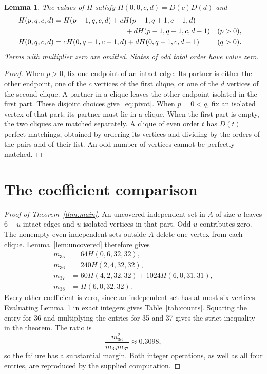 \documentclass[11pt]{article}
\newtheorem{lemma}[theorem]{Lemma}
\begin{document}
\begin{lemma}\label{lem:pivot}
The values of $H$ satisfy $H(0,0,c,d)=D(c)D(d)$ and
\begin{align}
H(p,q,c,d)&=H(p-1,q,c,d)+cH(p-1,q+1,c-1,d)\notag\\
&\hspace{35mm}+dH(p-1,q+1,c,d-1) &&(p>0),\label{eq:pivot}\\
H(0,q,c,d)&=cH(0,q-1,c-1,d)+dH(0,q-1,c,d-1)&&(q>0).
\end{align}
Terms with multiplier zero are omitted. States of odd total order have
value zero.
\end{lemma}
\begin{proof}
When $p>0$, fix one endpoint of an intact edge. Its partner is either
the other endpoint, one of the $c$ vertices of the first clique, or
one of the $d$ vertices of the second clique. A partner in a clique
leaves the other endpoint isolated in the first part. These disjoint
choices give~\eqref{eq:pivot}. When $p=0<q$, fix an isolated vertex
of that part; its partner must lie in a clique. When the first part
is empty, the two cliques are matched separately. A clique of even
order $t$ has $D(t)$ perfect matchings, obtained by ordering its
vertices and dividing by the orders of the pairs and of their list.
An odd number of vertices cannot be perfectly matched.
\end{proof}

\section{The coefficient comparison}
\begin{proof}[Proof of Theorem~\ref{thm:main}]
An uncovered independent set in $A$ of size $u$ leaves $6-u$ intact
edges and $u$ isolated vertices in that part. Odd $u$ contributes zero.
The nonempty even independent sets outside $A$ delete one vertex from
each clique. Lemma~\ref{lem:uncovered} therefore gives
\begin{align*}
m_{35}&=64H(0,6,32,32),\\
m_{36}&=240H(2,4,32,32),\\
m_{37}&=60H(4,2,32,32)+1024H(6,0,31,31),\\
m_{38}&=H(6,0,32,32).
\end{align*}
Every other coefficient is zero, since an independent set has at most
six vertices. Evaluating Lemma~\ref{lem:pivot} in exact integers gives
Table~\ref{tab:counts}. Squaring the entry for 36 and multiplying the
entries for 35 and 37 gives the strict inequality in the theorem.
The ratio is
\[
\frac{m_{36}^2}{m_{35}m_{37}}\approx 0.3098,
\]
so the failure has a substantial margin. Both integer operations, as
well as all four entries, are reproduced by the supplied computation.
\end{proof}
\end{document}
